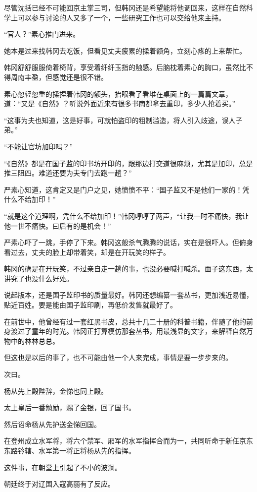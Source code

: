 尽管沈括已经不可能回京主掌三司，但韩冈还是希望能将他调回来，这样在自然科学上可以参与讨论的人又多了一个，一些研究工作也可以交给他来主持。

“官人？”素心推门进来。

她本是过来找韩冈去吃饭，但看见丈夫疲累的揉着额角，立刻心疼的上来帮忙。

韩冈舒舒服服倚着椅背，享受着纤纤玉指的触感。后脑枕着素心的胸口，虽然比不得周南丰盈，但感觉还是很不错。

素心忽轻忽重的揉捏着韩冈的额头，抬眼看了看堆在桌面上的一篇篇文章，道：“又是《自然》？听说外面近来有很多书商都拿去重印，多少人抢着买。”

“这事为夫也知道，这是好事，可就怕盗印的粗制滥造，将人引入歧途，误人子弟。”

“不能让官坊加印吗？”

“《自然》都是在国子监的印书坊开印的，跟那边打交道很麻烦，尤其是加印，总是推三阻四。难道还要为夫专门去跑一趟？”

严素心知道，这肯定又是门户之见，她愤愤不平：“国子监又不是他们一家的！凭什么不给加印！”

“就是这个道理啊，凭什么不给加印！”韩冈哼哼了两声，“让我一时不痛快，我让他一世不痛快。曰后有的是机会！”

严素心吓了一跳，手停了下来。韩冈这般杀气腾腾的说话，实在是很吓人。但俯身看过去，丈夫的脸上却带着笑，却是在开玩笑的样子。

韩冈的确是在开玩笑，不过亲自走一趟的事，也没必要喊打喊杀。面子这东西，太讲究了也没什么好处。

说起版本，还是国子监印书的质量最好。韩冈还想编纂一套丛书，更加浅近易懂，贴近百姓。要是能由国子监印刷，再低价发售就最好了。

在前世中，他曾经有过一套红黑书皮，总共十几二十册的科普书籍，伴随了他的前身渡过了童年的时光。韩冈正打算模仿那套丛书，用最浅显的文字，来解释自然万物中的林林总总。

但这也是以后的事了，也不可能由他一个人来完成，事情是要一步步来的。

次曰。

杨从先上殿陛辞，金悌也同上殿。

太上皇后一番勉励，赐了金银，回了国书。

然后诏命杨从先护送金悌回国。

在登州成立水军将，将六个禁军、厢军的水军指挥合而为一，共同听命于新任京东东路钤辖、水军第一将正将杨从先的指挥。

这件事，在朝堂上引起了不小的波澜。

朝廷终于对辽国入寇高丽有了反应。

